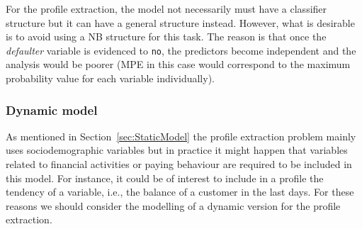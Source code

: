 



%

For the profile extraction, the model not necessarily must have a classifier structure but it can have a general structure instead. However, what is desirable is to avoid using a NB structure for this task. The reason is that once the \emph{defaulter} variable is evidenced to \texttt{no}, the predictors become independent and the analysis would be poorer (MPE in this case would correspond to the maximum probability value for each variable individually).



\subsubsection*{Dynamic model}

As mentioned in Section~\ref{sec:StaticModel} the profile extraction problem mainly uses sociodemographic variables but in practice it might happen that variables related to financial activities or paying behaviour are required to be included in this model.  For instance, it could be of interest to include in a profile the tendency of a variable, i.e., the balance of a customer in the last days. For these reasons we should consider the modelling of a dynamic version for the profile extraction. 

